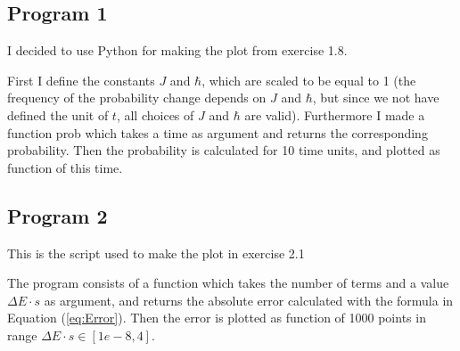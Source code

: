 \documentclass{scrartcl}
\begin{document}
\subsection*{Program 1}
I decided to use Python for making the plot from exercise 1.8. 

First I define the constants $J$ and $\hbar$, which are scaled to be equal to 1 (the frequency of the probability change depends on $J$ and $\hbar$, but since we not have defined the unit of $t$, all choices of $J$ and $\hbar$ are valid). Furthermore I made a function prob which takes a time as argument and returns the corresponding probability. Then the probability is calculated for 10 time units, and plotted as function of this time.
\newpage
\subsection*{Program 2}
This is the script used to make the plot in exercise 2.1

The program consists of a function which takes the number of terms and a value $\Delta E\cdot s$ as argument, and returns the absolute error calculated with the formula in Equation (\ref{eq:Error}). Then the error is plotted as function of 1000 points in range $\Delta E\cdot s\in [1e-8,4]$. 
\end{document}
